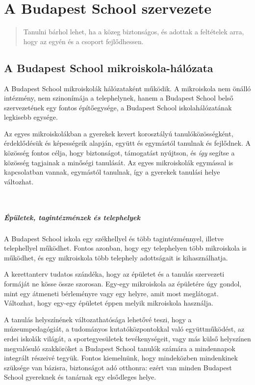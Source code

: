 
\chapter{A Budapest School szervezete}
\begin{quote}
Tanulni bárhol lehet, ha a közeg biztonságos, és adottak a feltételek arra, hogy az egyén és a csoport fejlődhessen.
\end{quote}

\section{A Budapest School mikroiskola-hálózata}

 A Budapest School mikroiskolák hálózataként működik. A mikroiskola nem önálló intézmény, nem szinonímája a telephelynek, hanem a Budapest School belső
 szervezetének egy fontos építőegysége, a Budapest School iskolahálózatának legkisebb egysége.

Az egyes mikroiskolákban a gyerekek kevert korosztályú tanulóközösségként,
érdeklődésük és képességeik alapján, együtt és egymástól tanulnak és fejlődnek.
A közösség fontos célja, hogy biztonságot, támogatást nyújtson, és \emph{így} segítse a közösség tagjainak a minőségi tanulását. Az egyes mikroiskolák egymással is kapcsolatban vannak,
egymástól tanulnak, így a gyerekek tanulási helye változhat.

 \paragraph{Épületek, tagintézménzek és telephelyek}
A Budapest School iskola egy székhellyel és több tagintézménnyel, illetve telephellyel működhet. Fontos azonban, hogy egy telephelyen több mikroiskola is működhet, és egy mikroiskola több telephely adottságait is kihasználhatja.

A kerettanterv tudatos szándéka, hogy az épületet és a
tanulás szervezeti formáját ne kösse össze szorosan. Egy-egy mikroiskola az épületére úgy gondol, mint egy átmeneti bérleményre vagy egy helyre, amit most meglátogat.
Változhat, hogy egy-egy épületet éppen melyik mikroiskola használja.

A tanulás helyszínének változathatósága lehetővé teszi, hogy a múzeumpedagógiát, a tudományos kutatóközpontokkal való együttműködést, az erdei iskolák világát, a sportegyesületek tevékenységeit, vagy más külső helyszínen megvalósuló szakköröket a Budapest School tanulók számára a mindennapok integrált részeivé tegyük. Fontos kiemelnünk, hogy mindeközben mindenkinek szüksége van bázisra, biztonságot adó otthonra: ezért van minden Budapest School gyereknek és tanárnak egy elsődleges helye.

